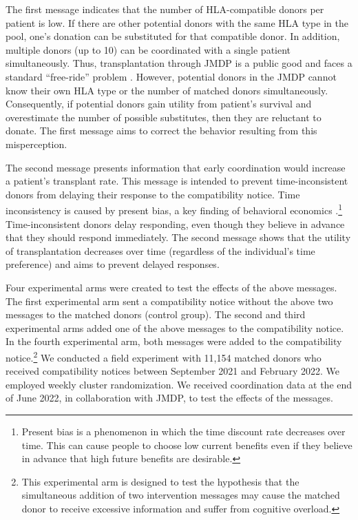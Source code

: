 \documentclass[12pt, a4paper]{article}
\begin{document}
The first message indicates that the number of HLA-compatible donors per patient is low. If there are other potential donors with the same HLA type in the pool, one's donation can be substituted for that compatible donor. In addition, multiple donors (up to 10) can be coordinated with a single patient simultaneously. Thus, transplantation through JMDP is a public good and faces a standard ``free-ride'' problem \citep{Bergstrom2009}. However, potential donors in the JMDP cannot know their own HLA type or the number of matched donors simultaneously. Consequently, if potential donors gain utility from patient's survival and overestimate the number of possible substitutes, then they are reluctant to donate. The first message aims to correct the behavior resulting from this misperception.

The second message presents information that early coordination would increase a patient's transplant rate. This message is intended to prevent time-inconsistent donors from delaying their response to the compatibility notice. Time inconsistency is caused by present bias, a key finding of behavioral economics \citep{Laibson1997, ODonoghue2001}.\footnote{Present bias is a phenomenon in which the time discount rate decreases over time. This can cause people to choose low current benefits even if they believe in advance that high future benefits are desirable.} Time-inconsistent donors delay responding, even though they believe in advance that they should respond immediately. The second message shows that the utility of transplantation decreases over time (regardless of the individual's time preference) and aims to prevent delayed responses.

Four experimental arms were created to test the effects of the above messages. The first experimental arm sent a compatibility notice without the above two messages to the matched donors (control group). The second and third experimental arms added one of the above messages to the compatibility notice. In the fourth experimental arm, both messages were added to the compatibility notice.\footnote{This experimental arm is designed to test the hypothesis that the simultaneous addition of two intervention messages may cause the matched donor to receive excessive information and suffer from cognitive overload.} We conducted a field experiment with 11,154 matched donors who received compatibility notices between September 2021 and February 2022. We employed weekly cluster randomization. We received coordination data at the end of June 2022, in collaboration with JMDP, to test the effects of the messages.
\end{document}
